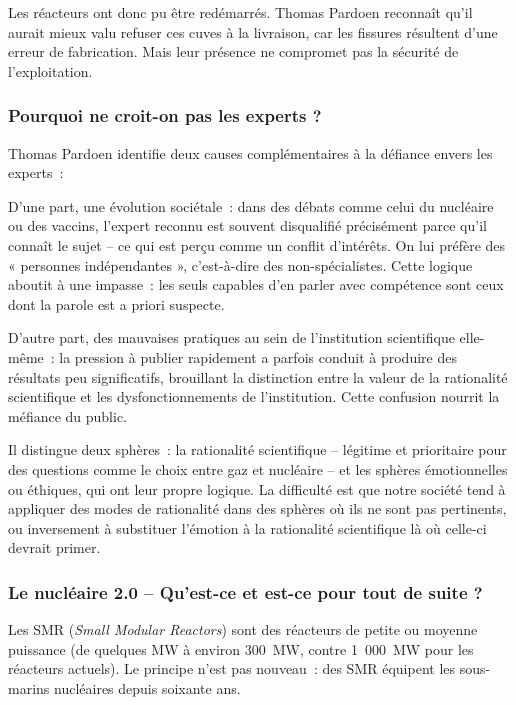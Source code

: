 Les réacteurs ont donc pu être redémarrés. Thomas Pardoen reconnaît qu'il aurait mieux valu refuser ces cuves à la livraison, car les fissures résultent d'une erreur de fabrication. Mais leur présence ne compromet pas la sécurité de l'exploitation.

\subsubsection{Pourquoi ne croit-on pas les experts ?}

Thomas Pardoen identifie deux causes complémentaires à la défiance envers les experts~:

D'une part, une évolution sociétale~: dans des débats comme celui du nucléaire ou des vaccins, l'expert reconnu est souvent disqualifié précisément parce qu'il connaît le sujet -- ce qui est perçu comme un conflit d'intérêts. On lui préfère des « personnes indépendantes », c'est-à-dire des non-spécialistes. Cette logique aboutit à une impasse~: les seuls capables d'en parler avec compétence sont ceux dont la parole est a priori suspecte.

D'autre part, des mauvaises pratiques au sein de l'institution scientifique elle-même~: la pression à publier rapidement a parfois conduit à produire des résultats peu significatifs, brouillant la distinction entre la valeur de la rationalité scientifique et les dysfonctionnements de l'institution. Cette confusion nourrit la méfiance du public.

Il distingue deux sphères~: la rationalité scientifique -- légitime et prioritaire pour des questions comme le choix entre gaz et nucléaire -- et les sphères émotionnelles ou éthiques, qui ont leur propre logique. La difficulté est que notre société tend à appliquer des modes de rationalité dans des sphères où ils ne sont pas pertinents, ou inversement à substituer l'émotion à la rationalité scientifique là où celle-ci devrait primer.

\subsubsection{Le nucléaire 2.0 -- Qu'est-ce et est-ce pour tout de suite ?}

Les SMR (\emph{Small Modular Reactors}) sont des réacteurs de petite ou moyenne puissance (de quelques MW à environ 300~MW, contre 1~000~MW pour les réacteurs actuels). Le principe n'est pas nouveau~: des SMR équipent les sous-marins nucléaires depuis soixante ans.

